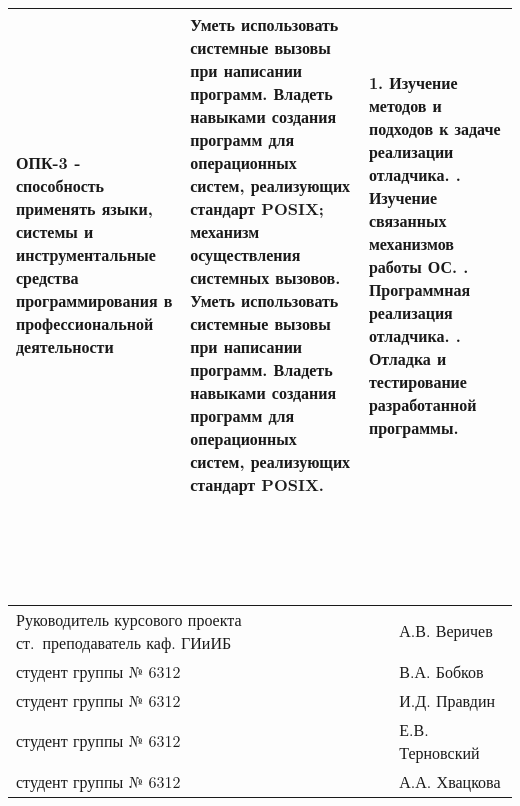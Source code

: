 \documentclass[oneside,final,14pt]{extreport}
\begin{document}
\begin{singlespacing}
\begin{minipage} {\textwidth}
\begin{center}
\begin{tabular}{
          			|p{}
          			|p{}
          			|p{}|
          		}
          		ОПК-3 ‑ способность применять языки, системы и инструментальные средства программирования в профессиональной деятельности & 
          		Уметь использовать системные вызовы при написании программ.
          		Владеть навыками создания программ для операционных систем, реализующих стандарт POSIX; механизм осуществления системных вызовов.
          		Уметь использовать системные вызовы при написании программ.
          		Владеть навыками создания программ для операционных систем, реализующих стандарт POSIX. &
          		1. Изучение методов и подходов к задаче реализации отладчика. \newline 
          		2. Изучение связанных механизмов работы ОС. \newline 
          		3. Программная реализация отладчика. \newline
          		4. Отладка и тестирование разработанной программы. \\ \hline 
          	\end{tabular}
          \end{center}
    	\end{minipage}\\

		\vfill
    \end{singlespacing}\\
 	\\\begin{minipage} {\textwidth}
		\noindent
		\begin{tabularx}{\textwidth}{p{}p{}X}
			Руководитель курсового проекта ст.~преподаватель каф. ГИиИБ &  \rightline{$\underset{\text{\itshape ({\small подпись})}}{\underline{\hspace{0.2\textwidth}}}$} & А.В. Веричев \\
			студент группы № 6312 &  \rightline{$\underset{\text{\itshape ({\small подпись})}}{\underline{\hspace{0.2\textwidth}}}$} &   В.А. Бобков\\
			студент группы № 6312 &  \rightline{$\underset{\text{\itshape ({\small подпись})}}{\underline{\hspace{0.2\textwidth}}}$} &  И.Д. Правдин \\
			студент группы № 6312 &  \rightline{$\underset{\text{\itshape ({\small подпись})}}{\underline{\hspace{0.2\textwidth}}}$} & Е.В. Терновский\\
			студент группы № 6312 &  \rightline{$\underset{\text{\itshape ({\small подпись})}}{\underline{\hspace{0.2\textwidth}}}$} &   А.А. Хвацкова \\
		\end{tabularx}
	\end{minipage}
\end{document}
